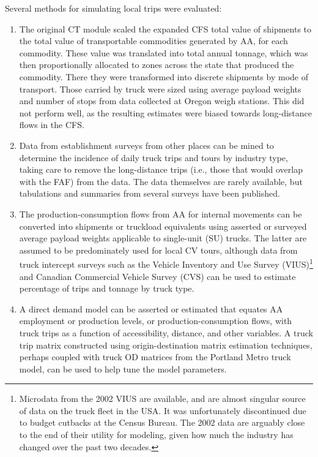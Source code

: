 Several methods for simulating local trips were evaluated:
\begin{enumerate}
\item The original CT module scaled the expanded CFS total value of shipments to the total value of transportable commodities generated by AA, for each commodity. These value was translated into total annual tonnage, which was then proportionally allocated to zones across the state that produced the commodity. There they were transformed into discrete shipments by mode of transport. Those carried by truck were sized using average payload weights and number of stops from data collected at Oregon weigh stations. This did not perform well, as the resulting estimates were biased towards long-distance flows in the CFS.
\item Data from establishment surveys from other places can be mined to determine the incidence of daily truck trips and tours by industry type, taking care to remove the long-distance trips (i.e., those that would overlap with the FAF) from the data. The data themselves are rarely available, but tabulations and summaries from several surveys have been published.
\item The production-consumption flows from AA for internal movements can be converted into shipments or truckload equivalents using asserted or surveyed average payload weights applicable to single-unit (SU) trucks. The latter are assumed to be predominately used for local CV tours, although data from truck intercept surveys such as the Vehicle Inventory and Use Survey (VIUS)\footnote{Microdata from the 2002 VIUS are available, and are almost singular source of data on the truck fleet in the USA. It was unfortunately discontinued due to budget cutbacks at the Census Bureau. The 2002 data are arguably close to the end of their utility for modeling, given how much the industry has changed over the past two decades.} and Canadian Commercial Vehicle Survey (CVS) can be used to estimate percentage of trips and tonnage by truck type.
\item A direct demand model can be asserted or estimated that equates AA employment or production levels, or production-consumption flows, with truck trips as a function of accessibility, distance, and other variables. A truck trip matrix constructed using origin-destination matrix estimation techniques, perhaps coupled with truck OD matrices from the Portland Metro truck model, can be used to help tune the model parameters.
\end{enumerate}

